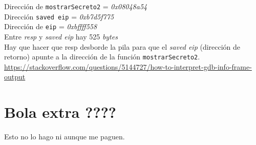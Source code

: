 \documentclass[10pt,a4paper]{article}
\begin{document}
Dirección de \texttt{mostrarSecreto2} = \emph{0x08048a54}\\
Dirección \texttt{saved eip} = \emph{0xb7d5f775}\\
Dirección de \texttt{eip} = \emph{0xbffff558}\\
Entre \emph{resp} y \emph{saved eip} hay 525 \emph{bytes}\\
Hay que hacer que resp desborde la pila para que el \emph{saved eip} (dirección de retorno) apunte a la dirección de la función \texttt{mostrarSecreto2}. \\


\url{https://stackoverflow.com/questions/5144727/how-to-interpret-gdb-info-frame-output}


\section{Bola extra ????}

Esto no lo hago ni aunque me paguen. 
\end{document}
